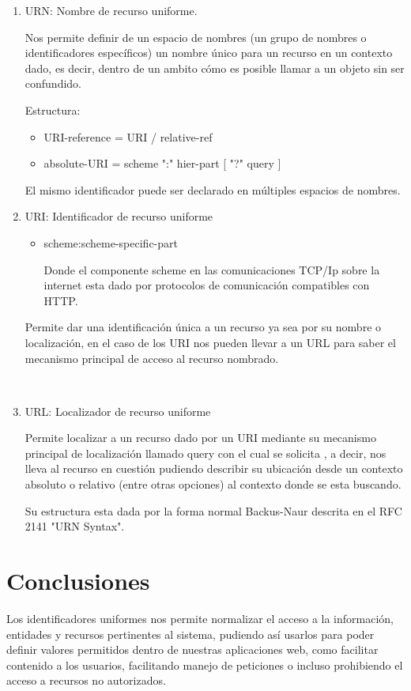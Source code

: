 \documentclass[12pt]{article}
\begin{document}
\begin{enumerate}
\item{URN: Nombre de recurso uniforme.  }


Nos permite definir de un espacio de nombres (un grupo de nombres o identificadores específicos) un nombre único para un recurso
en un contexto dado, es decir, dentro de un ambito cómo es posible llamar a un objeto sin ser confundido.


Estructura:
\begin{itemize}
\item{URI-reference = URI / relative-ref}
\item{absolute-URI  = scheme ":" hier-part [ "?" query ]}
\end{itemize}

El mismo identificador puede ser declarado en múltiples espacios de nombres.

\item{URI: Identificador de recurso uniforme}

\begin{itemize}

\item{scheme:scheme-specific-part}

Donde el componente scheme en las comunicaciones TCP/Ip sobre la internet esta dado por protocolos de comunicación compatibles con HTTP.
\end{itemize}


Permite dar una identificación única a un recurso ya sea por su nombre o localización, en el caso de los URI nos pueden llevar a un URL para saber
el mecanismo principal de acceso al recurso nombrado.


\\
\break
\item{URL: Localizador de recurso uniforme}
\hfill
\break

Permite localizar a un recurso dado por un URI mediante su mecanismo principal de localización llamado query con el cual se solicita , a decir, nos lleva al recurso en cuestión pudiendo describir
su ubicación desde un contexto absoluto o relativo (entre otras opciones) al contexto donde se esta buscando.
\hfill
\break

Su estructura esta dada por la forma normal Backus-Naur descrita en el RFC 2141 "URN Syntax".


\end{enumerate}




\section{Conclusiones}
Los identificadores uniformes nos permite normalizar el acceso a la información, entidades y recursos pertinentes al sistema, pudiendo así usarlos
para poder definir valores permitidos dentro de nuestras aplicaciones web, como facilitar contenido a los usuarios, facilitando manejo de peticiones o incluso
prohibiendo el acceso a recursos no autorizados.
\end{document}
